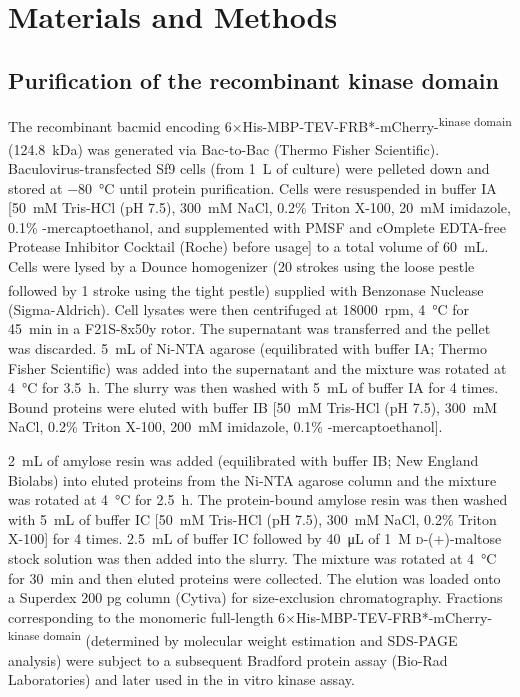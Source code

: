 \section{Materials and Methods}
\subsection{Purification of the recombinant  kinase domain}
The recombinant bacmid encoding 6×His-MBP-TEV-FRB*-mCherry-\textsuperscript{kinase domain} (\SI{124.8}{kDa}) was generated %
via Bac-to-Bac\textsuperscript{\textregistered} (Thermo Fisher Scientific). Baculovirus-transfected Sf9 cells (from \SI{1}{L} of culture) were pelleted down and stored at \SI{-80}{\celsius} until protein purification. Cells were resuspended in buffer IA [\SI{50}{mM} Tris-HCl (pH 7.5), \SI{300}{mM} NaCl, 0.2\% Triton X-100, \SI{20}{mM} imidazole, 0.1\% \textbeta-mercaptoethanol, and supplemented with PMSF and cOmplete\texttrademark{} EDTA-free Protease Inhibitor Cocktail (Roche) before usage] to a total volume of \SI{60}{mL}. Cells were lysed by a Dounce homogenizer (20 strokes using the loose pestle followed by 1 stroke using the tight pestle) supplied with Benzonase\textsuperscript{\textregistered} Nuclease (Sigma-Aldrich). Cell lysates were then centrifuged at \SI{18000}{rpm}, \SI{4}{\celsius} for \SI{45}{min} in a F21S-8x50y rotor. The supernatant was transferred and the pellet was discarded. \SI{5}{mL} of Ni-NTA agarose (equilibrated with buffer IA; Thermo Fisher Scientific) was added into the supernatant and the mixture was rotated at \SI{4}{\celsius} for \SI{3.5}{h}. The slurry was then washed with \SI{5}{mL} of buffer IA for 4 times. Bound proteins were eluted with buffer IB [\SI{50}{mM} Tris-HCl (pH 7.5), \SI{300}{mM} NaCl, 0.2\% Triton X-100, \SI{200}{mM} imidazole, 0.1\% \textbeta-mercaptoethanol].

\SI{2}{mL} of amylose resin was added (equilibrated with buffer IB; New England Biolabs) into eluted proteins from the Ni-NTA agarose column and the mixture was rotated at \SI{4}{\celsius} for \SI{2.5}{h}. The protein-bound amylose resin was then washed with \SI{5}{mL} of buffer IC [\SI{50}{mM} Tris-HCl (pH 7.5), \SI{300}{mM} NaCl, 0.2\% Triton X-100] for 4 times. \SI{2.5}{mL} of buffer IC followed by \SI{40}{\micro L} of \SI{1}{M} \textsc{d}-(+)-maltose stock solution was then added into the slurry. The mixture was rotated at \SI{4}{\celsius} for \SI{30}{min} and then eluted proteins were collected. The elution was loaded onto a Superdex 200 pg column (Cytiva) for size-exclusion chromatography. Fractions corresponding to the monomeric full-length 6×His-MBP-TEV-FRB*-mCherry-\textsuperscript{kinase domain} (determined by molecular weight estimation and SDS-PAGE analysis) were subject to a subsequent Bradford protein assay (Bio-Rad Laboratories) and later used in the in vitro kinase assay.

